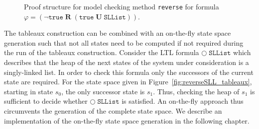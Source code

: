 \documentclass[a4paper, 12pt, twoside]{report}
\begin{document}
\begin{figure}
\begin{center}
{}
			\caption{Proof structure for model checking method \texttt{reverse} for formula $\varphi=(\neg\texttt{true}\;\textbf{R}\;(\texttt{true}\;\textbf{U}\;\texttt{SLList}))$.}\label{fig:tableaux_ps}
		\end{center}
	\end{figure}
	
	The tableaux construction can be combined with an on-the-fly state space generation such that not all states need to be computed if not required during the run of the tableaux construction. Consider the LTL formula $\bigcirc\;\texttt{SLList}$ which describes that the heap of the next states of the system under consideration is a singly-linked list. In order to check this formula only the successors of the current state are required. For the state space given in Figure~\ref{fig:reverseSLL_tableaux}, starting in state $s_0$, the only successor state is $s_1$. Thus, checking the heap of $s_1$ is sufficient to decide whether $\bigcirc\;\texttt{SLList}$ is satisfied. An on-the-fly approach thus circumvents the generation of the complete state space. We describe an implementation of the on-the-fly state space generation in the following chapter.
	
\end{document}
